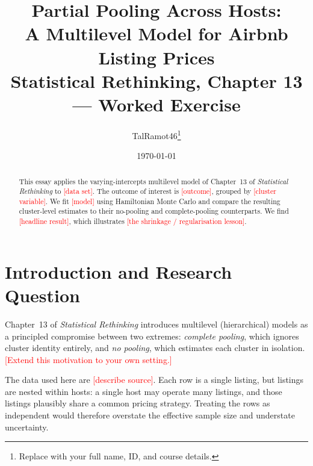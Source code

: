 \documentclass[11pt,a4paper]{article}
\title{\textbf{Partial Pooling Across Hosts:\\ A Multilevel Model for Airbnb Listing Prices}\\
       \large Statistical Rethinking, Chapter 13 --- Worked Exercise}
\author{TalRamot46\thanks{Replace with your full name, ID, and course details.}}
\date{\today}
\begin{document}
\maketitle

\begin{abstract}
This essay applies the varying-intercepts multilevel model of Chapter~13 of
\emph{Statistical Rethinking} to \textcolor{red}{[data set]}. The outcome of
interest is \textcolor{red}{[outcome]}, grouped by \textcolor{red}{[cluster
variable]}. We fit \textcolor{red}{[model]} using Hamiltonian Monte Carlo and
compare the resulting cluster-level estimates to their no-pooling and
complete-pooling counterparts. We find \textcolor{red}{[headline result]}, which
illustrates \textcolor{red}{[the shrinkage / regularisation lesson]}.
\end{abstract}

\tableofcontents
\bigskip

\section{Introduction and Research Question}

Chapter~13 of \emph{Statistical Rethinking} introduces multilevel (hierarchical)
models as a principled compromise between two extremes: \emph{complete pooling},
which ignores cluster identity entirely, and \emph{no pooling}, which estimates
each cluster in isolation. \textcolor{red}{[Extend this motivation to your own
setting.]}

The data used here are \textcolor{red}{[describe source]}. Each row is a single
listing, but listings are nested within hosts: a single host may operate many
listings, and those listings plausibly share a common pricing strategy. Treating
the rows as independent would therefore overstate the effective sample size and
understate uncertainty.
\end{document}
